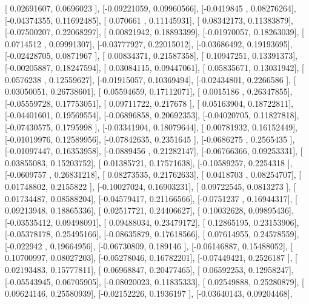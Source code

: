 \documentclass{article}
\begin{document}
       [ 0.02691607,  0.0696023 ],
       [-0.09221059,  0.09960566],
       [-0.0419845 ,  0.08276264],
       [-0.04374355,  0.11692485],
       [ 0.070661  ,  0.11145931],
       [ 0.08342173,  0.11383879],
       [-0.07500207,  0.22068297],
       [ 0.00821942,  0.18893399],
       [-0.01970057,  0.18263039],
       [ 0.0714512 ,  0.09991307],
       [-0.03777927,  0.22015012],
       [-0.03686492,  0.19193695],
       [-0.02428705,  0.0871967 ],
       [ 0.00834371,  0.21587358],
       [ 0.10947251,  0.13391373],
       [-0.00205887,  0.18247594],
       [ 0.03084115,  0.09447061],
       [ 0.05835671,  0.13031942],
       [ 0.0576238 ,  0.12559627],
       [-0.01915057,  0.10369494],
       [-0.02434801,  0.2266586 ],
       [ 0.03050051,  0.26738601],
       [ 0.05594659,  0.17112071],
       [ 0.0015186 ,  0.26347855],
       [-0.05559728,  0.17753051],
       [ 0.09711722,  0.217678  ],
       [ 0.05163904,  0.18722811],
       [-0.04401601,  0.19569554],
       [-0.06896858,  0.20692353],
       [-0.04020705,  0.11827818],
       [-0.07430575,  0.1795998 ],
       [-0.03341904,  0.18079644],
       [ 0.00781932,  0.16152449],
       [-0.01019976,  0.12589956],
       [-0.07842635,  0.2351645 ],
       [-0.0686275 ,  0.2565435 ],
       [-0.01097447,  0.16353958],
       [-0.0889456 ,  0.21282147],
       [-0.06766366,  0.09253331],
       [ 0.03855083,  0.15203752],
       [ 0.01385721,  0.17571638],
       [-0.10589257,  0.2254318 ],
       [-0.0609757 ,  0.26831218],
       [ 0.08273535,  0.21762633],
       [ 0.0418703 ,  0.08254707],
       [ 0.01748802,  0.2155822 ],
       [-0.10027024,  0.16903231],
       [ 0.09722545,  0.0813273 ],
       [ 0.01734487,  0.08588204],
       [-0.04579417,  0.21166566],
       [-0.0751237 ,  0.16944317],
       [ 0.09213948,  0.18865336],
       [ 0.02517721,  0.24406627],
       [ 0.10032628,  0.09895436],
       [-0.03535412,  0.09498091],
       [ 0.09488034,  0.23479172],
       [ 0.12865195,  0.23153906],
       [-0.05378178,  0.25495166],
       [-0.08635879,  0.17618566],
       [ 0.07614955,  0.24578559],
       [-0.022942  ,  0.19664956],
       [-0.06730809,  0.189146  ],
       [-0.06146887,  0.15488052],
       [ 0.10700997,  0.08027203],
       [-0.05278046,  0.16782201],
       [-0.07449421,  0.2526187 ],
       [ 0.02193483,  0.15777811],
       [ 0.06968847,  0.20477465],
       [ 0.06592253,  0.12958247],
       [-0.05543945,  0.06705905],
       [-0.08020023,  0.11835333],
       [ 0.02549888,  0.25280879],
       [ 0.09624146,  0.25580939],
       [-0.02152226,  0.1936197 ],
       [-0.03640143,  0.09204468],
\end{document}
